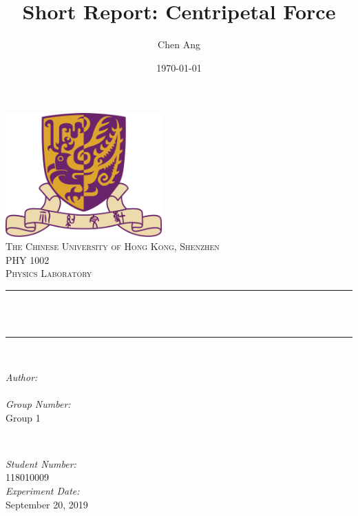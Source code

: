 \documentclass[12pt]{article}
\title{Short Report: Centripetal Force}                             %
\author{Chen Ang}                               %
\date{\today}                                           %
\makeatletter
\let\thetitle\@title
\let\theauthor\@author
\let\thedate\@date
\makeatother
\begin{document}

\begin{titlepage}
    \centering
    \vspace*{0.5 cm}
    \includegraphics[scale = 0.75,width=6cm]{CUHK}\\[1.0 cm]   %
    \textsc{\large The Chinese University of Hong Kong, Shenzhen}\\[2.0 cm]   %
    \textsc{\Large PHY 1002}\\[0.5 cm]               %
    \textsc{\large Physics Laboratory}\\[0.5 cm]               %
    \rule{\linewidth}{0.2 mm} \\[0.4 cm]
    { \huge \bfseries \thetitle}\\
    \rule{\linewidth}{0.2 mm} \\[1.5 cm]
    
    \begin{minipage}{0.4\textwidth}
        \begin{flushleft} \large
            \emph{Author:}\\
            \theauthor
            \\
            \emph{Group Number:} \\
            Group 1
            \end{flushleft}
            \end{minipage}~
            \begin{minipage}{0.4\textwidth}
            \begin{flushright} \large
            \emph{Student Number:} \\
            118010009                                   %
            \\
            \emph{Experiment Date:}\\
            September 20, 2019
        \end{flushright}
    \end{minipage}\\[2 cm]
    
    {\large \thedate}\\[2 cm]
 
    \vfill
    
\end{titlepage}


\tableofcontents
\pagebreak


\end{document}
